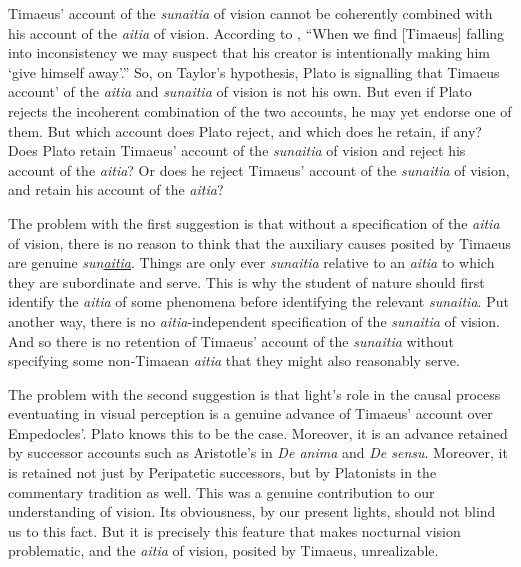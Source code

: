 Timaeus' account of the \emph{sunaitia} of vision cannot be coherently combined with his account of the \emph{aitia} of vision. According to \citet[614]{Taylor:1928qb}, ``When we find [Timaeus] falling into inconsistency we may suspect that his creator is intentionally making him `give himself away'.'' So, on Taylor's hypothesis, Plato is signalling that Timaeus account' of the \emph{aitia} and \emph{sunaitia} of vision is not his own. But even if Plato rejects the incoherent combination of the two accounts, he may yet endorse one of them. But which account does Plato reject, and which does he retain, if any? Does Plato retain Timaeus' account of the \emph{sunaitia} of vision and reject his account of the \emph{aitia}? Or does he reject Timaeus' account of the  \emph{sunaitia} of vision, and retain his account of the \emph{aitia}?

The problem with the first suggestion is that without a specification of the \emph{aitia} of vision, there is no reason to think that the auxiliary causes posited by Timaeus are genuine \emph{sun\underline{aitia}}. Things are only ever \emph{sunaitia} relative to an \emph{aitia} to which they are subordinate and serve. This is why the student of nature should first identify the \emph{aitia} of some phenomena before identifying the relevant \emph{sunaitia}. Put another way, there is no \emph{aitia}-independent specification of the \emph{sunaitia} of vision. And so there is no retention of Timaeus' account of the \emph{sunaitia} without specifying some non-Timaean \emph{aitia} that they might also reasonably serve.

The problem with the second suggestion is that light's role in the causal process eventuating in visual perception is a genuine advance of Timaeus' account over Empedocles'. Plato knows this to be the case. Moreover, it is an advance retained by successor accounts such as Aristotle's in \emph{De anima} and \emph{De sensu}. Moreover, it is retained not just by Peripatetic successors, but by Platonists in the commentary tradition as well. This was a genuine contribution to our understanding of vision. Its obviousness, by our present lights, should not blind us to this fact. But it is precisely this feature that makes nocturnal vision problematic, and the \emph{aitia} of vision, posited by Timaeus, unrealizable. 

